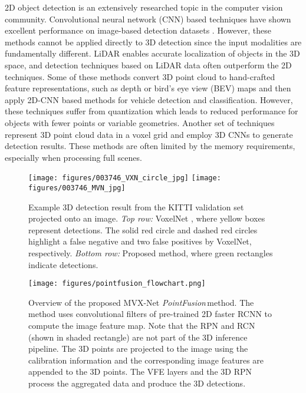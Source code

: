 \documentclass[letterpaper, 10 pt, conference]{ieeeconf}
\newcommand{\PF}{\textit{PointFusion}}
\begin{document}
2D object detection is an extensively researched topic in the computer vision community. Convolutional neural network (CNN) based techniques \cite{girshick2015fast,liu2016ssd,lin2017feature,redmon2016you} have shown excellent performance on image-based detection datasets \cite{lin2014microsoft,everingham2010pascal,imagenet_cvpr09}. However, these methods cannot be applied directly to 3D detection since the input modalities are fundamentally different. LiDAR enables accurate localization of objects in the 3D space, and detection techniques based on LiDAR data often outperform the 2D techniques. Some of these methods convert 3D point cloud to hand-crafted feature representations, such as depth or bird's eye view (BEV) maps \cite{REF:cvpr17chen,Yang2018CVPR} and then apply 2D-CNN based methods for vehicle detection and classification. However, these techniques suffer from quantization which leads to reduced performance for objects with fewer points or variable geometries. Another set of techniques represent 3D point cloud data in a voxel grid \cite{REF:maturana_iros_2015,REF:maturana_icra_2014} and employ 3D CNNs to generate detection results. These methods are often limited by the memory requirements, especially when processing full scenes. 



\begin{figure}[!t]
	\centering
	\texttt{[image: figures/003746\_VXN\_circle\_jpg]}
	\texttt{[image: figures/003746\_MVN\_jpg]}	
	\vskip-15pt
	\caption{Example 3D detection result from the KITTI validation set projected onto an image. \textit{Top row:} VoxelNet \cite{REF:zhou2017voxelnet}, where yellow boxes represent detections. The solid red circle and dashed red circles highlight a false negative and two false positives by VoxelNet, respectively. \textit{Bottom row:} Proposed method, where green rectangles indicate detections.}
	\label{fig:sampleresult}
	\vspace{-0.5cm}
\end{figure}	


\begin{figure*}[ht!]
	\centering
	\texttt{[image: figures/pointfusion\_flowchart.png]}
	\vskip-10pt	
	\caption{Overview of the proposed MVX-Net \PF{\,}method. The method uses convolutional filters of pre-trained 2D faster RCNN to compute the image feature map. Note that the RPN and RCN (shown in shaded rectangle) are not part of the 3D inference pipeline. The 3D points are projected to the image using the calibration information and the corresponding image features are appended to the 3D points. The VFE layers and the 3D RPN process the aggregated data and produce the 3D detections. }
	\label{fig:pfarch}
	\vspace{-0.5cm}
\end{figure*}
\end{document}
